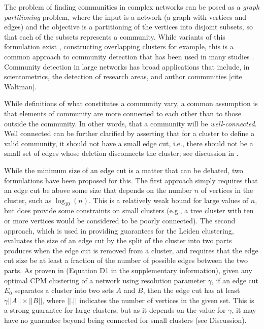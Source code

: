 \documentclass[12pt, oneside]{article}   	%
\begin{document}
The problem of finding communities in complex networks can be posed as a {\em graph partitioning} problem, where the input is a network (a graph with vertices and edges) and the
objective is a partitioning of the vertices into disjoint subsets, so that each of the subsets represents a community. While variants of this formulation exist \citep{Coscia2011}, constructing 
overlapping clusters for example, this is a common approach to community detection that has been used in many studies \citep{Fortunato2022,Fortunato2010}. Community detection in 
large networks has broad applications that include, in scientometrics, the detection of research areas, and author communities [cite Waltman].

While definitions of what constitutes a community vary, a common assumption is that elements of community are more connected to each other than to those outside the community. 
In other words, that a community will be {\em well-connected}. Well connected can be further clarified by asserting that for a cluster to define a valid community, it  should not have a small 
edge cut, i.e., there should not be a small set of edges whose deletion disconnects the cluster; see discussion in \cite{Traag_2019}. 


While the minimum size of an edge cut is a matter that can be debated, two formulations have been proposed for this.
The first approach simply requires that an edge cut be above some size that depends on the number $n$ of vertices in the cluster, such as $\log_{10}(n)$. 
This is a relatively weak bound for large values of $n$, but does provide some constraints on small clusters (e.g., a tree cluster with ten or more vertices would be considered to be poorly connected).  
The second approach, which is used in providing guarantees for the Leiden clustering, evaluates the size of an edge cut by the split  of the cluster into two parts produces when the edge cut is removed from a cluster, and requires that the
edge cut size be at least a fraction of the number of possible edges between the two  parts.
As proven in \cite{Traag_2019} (Equation D1 in the supplementary information), 
given any optimal CPM clustering of a network using resolution parameter $\gamma$, if an edge cut $E_0$
separates a cluster into two sets $A$ and $B$, then the edge cut has at least $\gamma ||A|| \times ||B||$, where
$||.||$ indicates the number of vertices in the given set.
This is a strong guarantee for large clusters,  but as it depends on the value for $\gamma$, it may have no guarantee  beyond being connected for small clusters
(see Discussion). 
\end{document}
